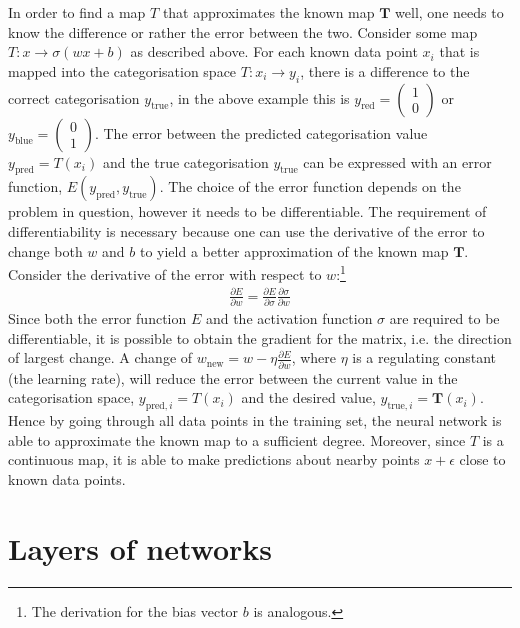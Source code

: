 \documentclass[a4paper, justified]{tufte-handout}
\begin{document}
In order to find a map $T$ that approximates the known map $\mathbf{T}$ well, one needs to know the difference or rather the error between the two. Consider some map $T: x\to \sigma(wx+b)$ as described above. For each known data point $x_i$ that is mapped into the categorisation space $T: x_i \to y_i$, there is a difference to the correct categorisation $y_\text{true}$, in the above example this is $y_\text{red} = (\begin{smallmatrix} 1\\0\end{smallmatrix})$ or $y_\text{blue} = (\begin{smallmatrix} 0\\1\end{smallmatrix})$. The error between the predicted categorisation value $y_\text{pred} = T(x_i)$ and the true categorisation $y_\text{true}$ can be expressed with an error function, $E(y_\text{pred}, y_\text{true})$. The choice of the error function depends on the problem in question, however it needs to be differentiable. The requirement of differentiability is necessary because one can use the derivative of the error to change both $w$ and $b$ to yield a better approximation of the known map $\mathbf{T}$. Consider the derivative of the error with respect to $w$:\footnote{The derivation for the bias vector $b$ is analogous.}
\begin{align}
\frac{\partial E}{\partial w} = \frac{\partial E}{\partial \sigma} \frac{\partial \sigma}{\partial w}\label{eq:simpleupdate}
\end{align}
Since both the error function $E$ and the activation function $\sigma$ are required to be differentiable, it is possible to obtain the gradient for the matrix, i.e. the direction of largest change. A change of $w_\text{new} = w - \eta \frac{\partial E}{\partial w}$, where $\eta$ is a regulating constant (the learning rate), will reduce the error between the current value in the categorisation space, $y_{\text{pred}, i} = T(x_i)$ and the desired value, $y_{\text{true}, i} = \mathbf{T}(x_i)$. Hence by going through all data points in the training set, the neural network is able to approximate the known map to a sufficient degree. Moreover, since $T$ is a continuous map, it is able to make predictions about nearby points $x+\epsilon$ close to known data points.

\section{Layers of networks}
\end{document}
